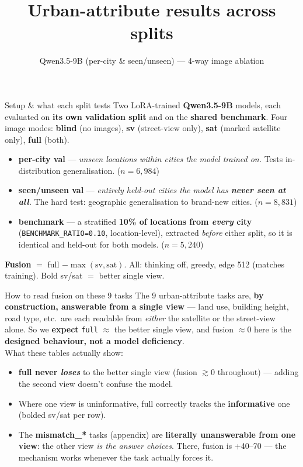 \documentclass[aspectratio=169]{beamer}
\title{Urban-attribute results across splits}
\subtitle{Qwen3.5-9B (per-city \& seen/unseen) --- 4-way image ablation}
\date{}\author{}
\begin{document}
\maketitle

\begin{frame}{Setup \& what each split tests}
\small
Two LoRA-trained \textbf{Qwen3.5-9B} models, each evaluated on \textbf{its own validation split}
and on the \textbf{shared benchmark}. Four image modes: \textbf{blind} (no images),
\textbf{sv} (street-view only), \textbf{sat} (marked satellite only), \textbf{full} (both).\\[6pt]
\begin{itemize}
\item \textbf{per-city val} --- \emph{unseen locations within cities the model trained on.}
  Tests in-distribution generalisation. ($n=6{,}984$)
\item \textbf{seen/unseen val} --- \emph{entirely held-out cities the model has \textbf{never seen at all}.}
  The hard test: geographic generalisation to brand-new cities. ($n=8{,}831$)
\item \textbf{benchmark} --- a stratified \textbf{10\% of locations from \emph{every} city}
  (\texttt{BENCHMARK\_RATIO=0.10}, location-level), extracted \emph{before} either split, so it is
  identical and held-out for both models. ($n=5{,}240$)
\end{itemize}
\textbf{Fusion} $=$ full $-\max(\text{sv},\text{sat})$. All: thinking off, greedy, edge 512 (matches training). Bold sv/sat $=$ better single view.
\end{frame}

\begin{frame}{How to read fusion on these 9 tasks}
\small
The 9 urban-attribute tasks are, \textbf{by construction, answerable from a single view} ---
land use, building height, road type, etc.\ are each readable from \emph{either} the satellite
or the street-view alone. So we \textbf{expect} \texttt{full} $\approx$ the better single view, and
fusion $\approx 0$ here is the \textbf{designed behaviour, not a model deficiency}.\\[6pt]
What these tables actually show:
\begin{itemize}
\item \textbf{full never \emph{loses}} to the better single view (fusion $\gtrsim 0$ throughout) --- adding
  the second view doesn't confuse the model.
\item Where one view is uninformative, full correctly tracks the \textbf{informative} one
  (bolded sv/sat per row).
\item The \textbf{mismatch\_*} tasks (appendix) are \textbf{literally unanswerable from one view}:
  the other view \emph{is the answer choices}. There, fusion is +40--70 --- the mechanism works
  whenever the task actually forces it.
\end{itemize}
\end{frame}
\end{document}

